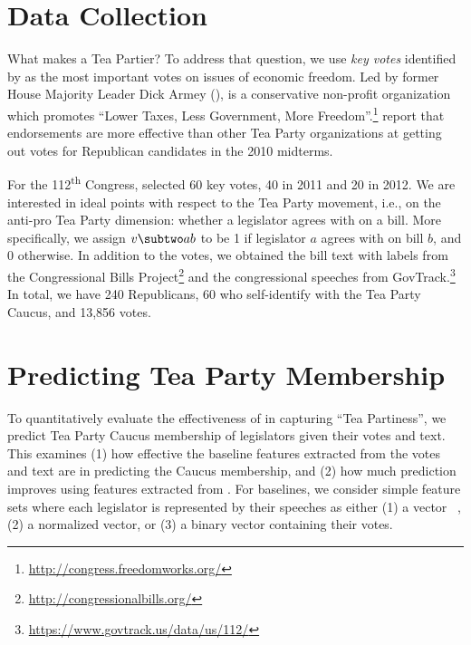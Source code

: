 \section{Data Collection}
\label{sec:c6_data}

What makes a Tea Partier?  To address that question, we use
\textit{key votes} identified by \fw{} as the most important votes on
issues of economic freedom.  Led by former House Majority Leader Dick
Armey (), \fw{} is a conservative non-profit organization
which promotes ``Lower Taxes, Less Government, More
Freedom''.\footnote{\url{http://congress.freedomworks.org/}}
 report that \fw{} endorsements are
more effective than other Tea Party organizations at getting out votes
for Republican candidates in the 2010 midterms.

For the 112\textsuperscript{th} Congress, \fw{} selected 60 key votes,
40 in 2011 and 20 in 2012.  We are interested in ideal points with
respect to the Tea Party movement, i.e., on the anti-pro Tea Party
dimension: whether a legislator agrees with \fw{} on a bill. More
specifically, we assign $v \subtwo ab$ to be 1 if legislator $a$
agrees with \fw{} on bill $b$, and 0 otherwise. In addition to the votes, we obtained the bill text with labels from the Congressional Bills Project\footnote{\url{http://congressionalbills.org/}} and the congressional speeches from GovTrack.\footnote{\url{https://www.govtrack.us/data/us/112/}} In total, we have 240
Republicans, 60 who self-identify with the Tea Party Caucus, and
13,856 votes.

\section{Predicting Tea Party Membership}
\label{sec:c6_prediction}

To quantitatively evaluate the effectiveness of \name{} in
capturing ``Tea Partiness'', we predict Tea Party Caucus membership of
legislators given their votes and text. This examines (1) how effective the baseline
features extracted from the votes and text are in predicting the Caucus
membership, and (2) how much prediction improves using features extracted from \name{}.
For baselines, we consider simple feature sets where each legislator
is represented by their speeches as either (1) a \tfidf{}
vector ~\cite{salton-68}, (2) a normalized \tfidf{} vector, or (3) a binary vector
containing their votes.

